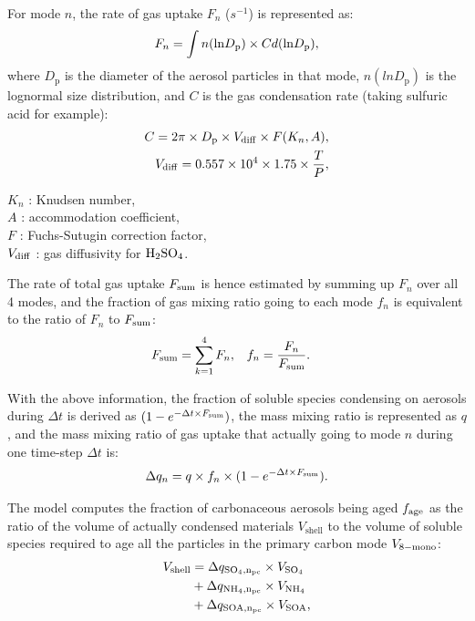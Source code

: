 \documentclass[12pt, fullpage]{uiucthesis2009}
\begin{document}
	For mode $n$, the rate of gas uptake $F_{n}$ ($s^{-1}$) is represented as:
	\begin{equation}
	F_{n} = \int n(\text{ln}D_{\rm{p}})\times C d(\text{ln}D_\text{p}) ,
	\end{equation}
	where $D_\text{p}$ is the diameter of the aerosol particles in that mode, $n(lnD_\text{p})$ is the lognormal size distribution, and $C$ is the gas condensation rate (taking sulfuric acid for example):
	\begin{align}
	C = 2\pi \times D_\text{p} \times V_{\rm{diff}} \times F(K_{n}, A) ,\\
	V_{\rm{diff}} = 0.557 \times 10^4 \times 1.75 \times \frac{T}{P}, 
	\end{align}
	
	
	\begin{flushleft}
		$K_{n}$ : Knudsen number, \\
		$A$ : accommodation coefficient, \\
		$F$ : Fuchs-Sutugin correction factor, \\
		$V_{\rm{diff}}$ : gas diffusivity for  $\rm{H_2SO_4}$.
	\end{flushleft}
	The rate of total gas uptake $F_{\rm{sum}}$ is hence estimated by summing up $F_{n}$ over all 4 modes, and the fraction of gas mixing ratio going to each mode $f_{n}$ is equivalent to the ratio of $F_{n}$ to $F_{\rm{sum}}$:
	\begin{align}
	F_{\rm{sum}}  &= \sum_{k=1}^4 F_{n},         &
	f_{n}          &= \frac{F_{n}}{F_{\rm{sum}}}. 
	\end{align}
	
	With the above information, the fraction of soluble species condensing on aerosols during $\Delta t$ is derived as $(1 - e^{-\Delta t\times F_{\rm{sum}}})$, the mass mixing ratio is represented as $q$, and the mass mixing ratio of gas uptake that actually going to mode $n$ during one time-step $\Delta t$ is:
	\begin{equation}
	\Delta q_{n} = q \times f_{n} \times (1 - e^{-\Delta t\times F_ {\rm{sum}}}).
	\end{equation}
	
	The model computes the fraction of carbonaceous aerosols being aged $f_{\rm{age}}$ as the ratio of the volume of actually condensed materials $V_\text{shell}$ to the volume of soluble species required to age all the particles in the primary carbon mode $V_{\rm{8-mono}}$:
	\begin{align}
	\begin{split}
	V_{\rm{shell}} &=  \Delta q_{\rm{SO_4}, n_{\rm{pc}}} \times V_{\rm{SO_4}} \\
	&+ \Delta q_{\rm{NH_4}, n_{\rm{pc}}} \times V_{\rm{NH_4}} \\
	&+ \Delta q_{\rm{SOA}, n_{\rm{pc}}} \times V_{\rm{SOA}}, 
	\end{split}
	\end{align}
	
\end{document}
